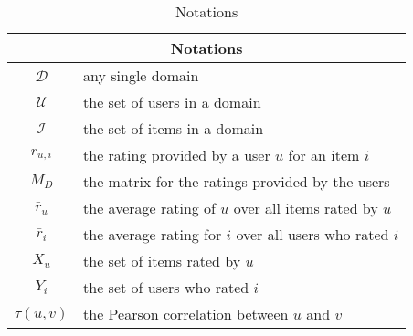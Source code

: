 \begin{table}[t]
\centering
\setlength\extrarowheight{0.8pt}
\begin{tabular}{ |c|p{6.5cm}| }
  \hline
  \multicolumn{2}{|c|}{Notations} \\
  \hline
  $\mathcal{D}$ & {\small any single domain} \\ \hline
  $\mathcal{U}$ & {\small the set of users in a domain} \\ \hline
  $\mathcal{I}$ & {\small the set of items in a domain} \\ \hline
  $r_{u,i}$ & {\small the rating provided by a user $u$ for an item $i$} \\ \hline
  $M_D$ & {\small the matrix for the ratings provided by the users\footnotemark} \\ \hline
  $\bar{r}_u$ & {\small the average rating of $u$ over all items rated by $u$} \\ \hline
  $\bar{r}_i$ & {\small the average rating for $i$ over all users who rated $i$} \\ \hline
  $X_u$  & {\small the set of items rated by $u$} \\ \hline
  $Y_i$ & {\small the set of users who rated $i$} \\ \hline
  $\tau(u,v)$ & {\small the Pearson correlation between $u$ and $v$}\\
  \hline
\end{tabular}
\caption{ Notations}
\label{fig:NotationTable}
\end{table}


